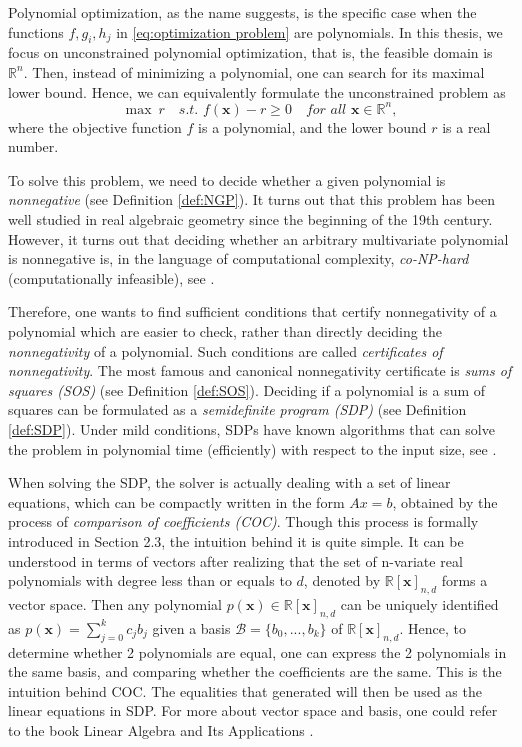 \documentclass[12pt]{amsart}
\numberwithin{equation}{section}
\theoremstyle{definition}
\numberwithin{thm}{section}
\begin{document}
Polynomial optimization, as the name suggests, is the specific case when the functions $f, g_i, h_j$ in \eqref{eq:optimization problem} are polynomials.
In this thesis, we focus on unconstrained polynomial optimization, that is, the feasible domain is $\mathbb{R}^n$.
Then, instead of minimizing a polynomial, one can search for its maximal lower bound.
Hence, we can equivalently formulate the unconstrained problem as 
\begin{equation*}
     \max \ r \quad \textit{s.t. } f(\mathbf{x}) - r \geq 0 \quad \textit{for all } \mathbf{x} \in \mathbb{R}^n,
 \end{equation*}
where the objective function $f$ is a polynomial, and the lower bound $r$ is a real number. 

To solve this problem, we need to decide whether a given polynomial is \emph{nonnegative} (see Definition \ref{def:NGP}).
It turns out that this problem has been well studied in real algebraic geometry since the beginning of the 19th century. 
However, it turns out that deciding whether an arbitrary multivariate polynomial is nonnegative is,
in the language of computational complexity, \emph{co-NP-hard} (computationally infeasible), see \cite[Chapter 3]{Blekherman:Parrilo:Thomas}.

Therefore, one wants to find sufficient conditions that certify nonnegativity of a polynomial which are easier to check, 
rather than directly deciding the \emph{nonnegativity} of a polynomial. 
Such conditions are called \emph{certificates of nonnegativity}.
The most famous and canonical nonnegativity certificate is \emph{sums of squares (SOS)} (see Definition \ref{def:SOS}).
Deciding if a polynomial is a sum of squares can be formulated as a \emph{semidefinite program (SDP)} (see Definition \ref{def:SDP}).
Under mild conditions, SDPs have known algorithms that can solve the problem in polynomial time (efficiently) with respect to the input size, see \cite[Chapter~2]{Blekherman:Parrilo:Thomas}.

When solving the SDP, the solver is actually dealing with a set of linear equations, which can be compactly written in the form $Ax = b$, obtained by the process of \emph{comparison of coefficients (COC)}.
Though this process is formally introduced in Section 2.3, the intuition behind it is quite simple. 
It can be understood in terms of vectors after realizing that the set of n-variate real polynomials with degree less than or equals to $d$, denoted by $\mathbb{R}[\mathbf{x}]_{n, d}$ forms a vector space.
Then any polynomial $p(\mathbf{x}) \in \mathbb{R}[\mathbf{x}]_{n, d}$ can be uniquely identified as $p(\mathbf{x}) = \sum_{j = 0}^k c_j b_j$ given a basis $\mathcal{B} = \{b_0, ..., b_k\}$ of $\mathbb{R}[\mathbf{x}]_{n, d}$.
Hence, to determine whether 2 polynomials are equal, one can express the 2 polynomials in the same basis, 
and comparing whether the coefficients are the same. This is the intuition behind COC. 
The equalities that generated will then be used as the linear equations in SDP.
For more about vector space and basis, one could refer to the book Linear Algebra and Its Applications \cite{Lay_David2014-12-24}.
\end{document}
